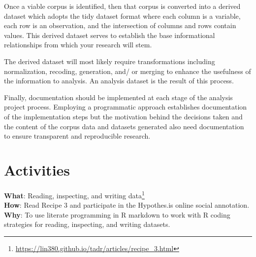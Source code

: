 \documentclass[
  letterpaper,
]{scrbook}
\DeclareRobustCommand{\href}[2]{#2\footnote{\url{#1}}}
\begin{document}
Once a viable corpus is identified, then that corpus is converted into a
derived dataset which adopts the tidy dataset format where each column
is a variable, each row is an observation, and the intersection of
columns and rows contain values. This derived dataset serves to
establish the base informational relationships from which your research
will stem.

The derived dataset will most likely require transformations including
normalization, recoding, generation, and/ or merging to enhance the
usefulness of the information to analysis. An analysis dataset is the
result of this process.

Finally, documentation should be implemented at each stage of the
analysis project process. Employing a programmatic approach establishes
documentation of the implementation steps but the motivation behind the
decisions taken and the content of the corpus data and datasets
generated also need documentation to ensure transparent and reproducible
research.

\hypertarget{activities-1}{%
\section*{Activities}\label{activities-1}}


\begin{tcolorbox}[enhanced jigsaw, title=\textcolor{quarto-callout-tip-color}{\faLightbulb}\hspace{0.5em}{Recipe}, breakable, colback=white, colframe=quarto-callout-tip-color-frame, bottomrule=.15mm, left=2mm, bottomtitle=1mm, colbacktitle=quarto-callout-tip-color!10!white, opacityback=0, arc=.35mm, toprule=.15mm, coltitle=black, leftrule=.75mm, opacitybacktitle=0.6, toptitle=1mm, titlerule=0mm, rightrule=.15mm]

\textbf{What}:
\href{https://lin380.github.io/tadr/articles/recipe_3.html}{Reading,
inspecting, and writing data}\\
\textbf{How}: Read Recipe 3 and participate in the Hypothes.is online
social annotation.\\
\textbf{Why}: To use literate programming in R markdown to work with R
coding strategies for reading, inspecting, and writing datasets.

\end{tcolorbox}
\end{document}
